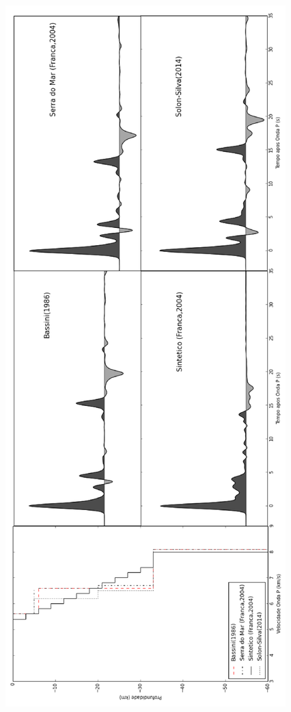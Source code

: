 \begin{figure}[!ht]
\centering
\includegraphics[scale=0.4]{modelagem_RF.png}
\caption{}
\label{modelagem}
\end{figure}

